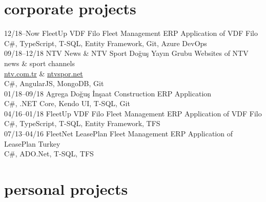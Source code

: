 \documentclass[]{../friggeri-cv} %
\begin{document}
\section{corporate projects}

\begin{entrylist}

\entry
{12/18--Now}
{FleetUp}
{VDF Filo}
{Fleet Management ERP Application of VDF Filo
\\C\#, TypeScript, T-SQL, Entity Framework, Git, Azure DevOps}
\\
\entry
{09/18--12/18}
{NTV News \& NTV Sport}
{Doğuş Yayın Grubu}
{Websites of NTV news \& sport channels
\\\href{https://www.ntv.com.tr/}{ntv.com.tr} \& \href{http://www.ntvspor.net/}{ntvspor.net}
\\C\#, AngularJS, MongoDB, Git}
\\
\entry
{01/18--09/18}
{Agrega}
{Doğuş İnşaat}
{Construction ERP Application
\\C\#, .NET Core, Kendo UI, T-SQL, Git}
\\
\entry
{04/16--01/18}
{FleetUp}
{VDF Filo}
{Fleet Management ERP Application of VDF Filo
\\C\#, TypeScript, T-SQL, Entity Framework, TFS}
\\
\entry
{07/13--04/16}
{FleetNet}
{LeasePlan}
{Fleet Management ERP Application of LeasePlan Turkey
\\C\#, ADO.Net, T-SQL, TFS}

\end{entrylist}

\section{personal projects}
\end{document}
